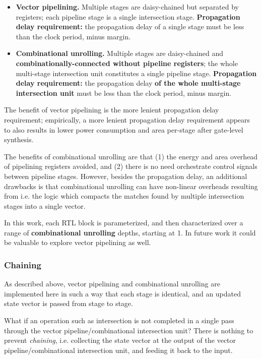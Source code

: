 \begin{itemize}
    \item \textbf{Vector pipelining.} Multiple stages are daisy-chained but separated by registers; each pipeline stage is a single intersection stage. \textbf{Propagation delay requirement:} the propagation delay of a single stage must be less than the clock period, minus margin.
    \item \textbf{Combinational unrolling.} Multiple stages are daisy-chained and \textbf{combinationally-connected without pipeline registers}; the whole multi-stage intersection unit constitutes a single pipeline stage. \textbf{Propagation delay requirement:} the propagation delay \textbf{of the whole multi-stage intersection unit} must be less than the clock period, minus margin.
\end{itemize}

The benefit of vector pipelining is the more lenient propagation delay requirement; empirically, a more lenient propagation delay requirement appears to also results in lower power consumption and area per-stage after gate-level synthesis.

The benefits of combinational unrolling are that (1) the energy and area overhead of pipelining registers avoided, and (2) there is no need orchestrate control signals between pipeline stages. However, besides the propagation delay, an additional drawbacks is that combinational unrolling can have non-linear overheads resulting from i.e. the logic which compacts the matches found by multiple intersection stages into a single vector.

In this work, each RTL block is parameterized, and then characterized over a range of \textbf{combinational unrolling} depths, starting at 1. In future work it could be valuable to explore vector pipelining as well.

\subsubsection{Chaining}

As described above, vector pipelining and combinational unrolling are implemented here in such a way that each stage is identical, and an updated state vector is passed from stage to stage.

What if an operation such as intersection is not completed in a single pass through the vector pipeline/combinational intersection unit? There is nothing to prevent \textit{chaining}, i.e. collecting the state vector at the output of the vector pipeline/combinational intersection unit, and feeding it back to the input. 

